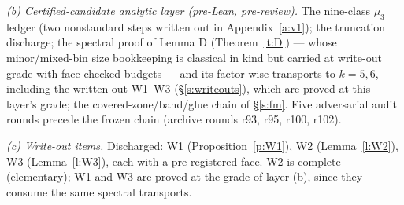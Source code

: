 \documentclass[11pt]{article}
\numberwithin{equation}{section}
\theoremstyle{definition}
\theoremstyle{remark}
\begin{document}
\emph{(b) Certified-candidate analytic layer (pre-Lean,
pre-review).} The nine-class $\mu_3$ ledger (two nonstandard
steps written out in Appendix~\ref{a:v1}); the truncation
discharge; the spectral proof of Lemma D (Theorem~\ref{t:D}) ---
whose minor/mixed-bin size bookkeeping is classical in kind but
carried at write-out grade with face-checked budgets --- and its
factor-wise transports to $k=5,6$, including the written-out
W1--W3 (\S\ref{s:writeouts}), which are proved at this layer's
grade; the covered-zone/band/glue chain of \S\ref{s:fm}. Five
adversarial audit rounds precede the frozen chain (archive
rounds r93, r95, r100, r102).

\emph{(c) Write-out items.} Discharged:
W1 (Proposition~\ref{p:W1}), W2 (Lemma~\ref{l:W2}), W3
(Lemma~\ref{l:W3}), each with a pre-registered face. W2 is
complete (elementary); W1 and W3 are proved at the grade of
layer (b), since they consume the same spectral transports.
\end{document}
